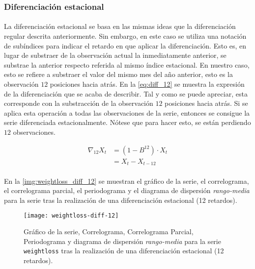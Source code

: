 \documentclass[a4paper, spanish]{article}
\begin{document}
      \subsubsection{Diferenciación estacional}
      \label{sec:seasonal_difference}

        \paragraph{}
        La diferenciación estacional se basa en las mismas ideas que la diferenciación regular descrita anteriormente. Sin embargo, en este caso se utiliza una notación de subíndices para indicar el retardo en que aplicar la diferenciación. Esto es, en lugar de substraer de la observación actual la inmediatamente anterior, se substrae la anterior respecto referida al mismo índice estacional. En nuestro caso, esto se refiere a substraer el valor del mismo mes del año anterior, esto es la observación $12$ posiciones hacia atrás. En la \autoref{eq:diff_12} se muestra la expresión de la diferenciación que se acaba de describir. Tal y como se puede apreciar, esta corresponde con la substracción de la observación $12$ posiciones hacia atrás. Si se aplica esta operación a todas las observaciones de la serie, entonces se consigue la serie diferenciada estacionalmente. Nótese que para hacer esto, se están perdiendo $12$ observaciones.

        \begin{equation}
        \label{eq:diff_12}
          \begin{split}
            \nabla_{12} X_t
            &= (1 - B^12) \cdot X_t \\
            &= X_t - X_{t - 12}
          \end{split}
        \end{equation}

        \paragraph{}
        En la \autoref{img:weightloss_diff_12} se muestran el gráfico de la serie, el correlograma, el correlograma parcial, el periodograma y el diagrama de dispersión \emph{rango-media} para la serie tras la realización de una diferenciación estacional (12 retardos).

        \begin{figure}[htb!]
          \texttt{[image: weightloss-diff-12]}
          \caption{Gráfico de la serie, Correlograma, Correlograma Parcial, Periodograma y diagrama de dispersión \emph{rango-media} para la serie \texttt{weightloss} tras la realización de una diferenciación estacional (12 retardos).}
          \label{img:weightloss_diff_12}
        \end{figure}
\end{document}
